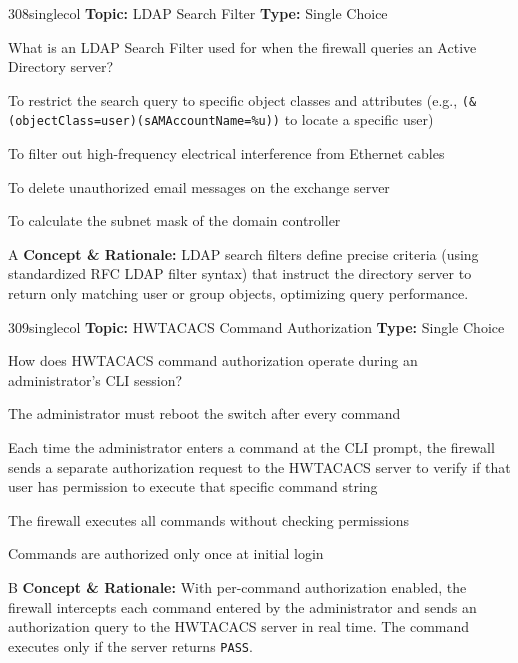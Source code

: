 \begin{qcard}{308}{singlecol}
\textcolor{darkslate!75}{\small\textbf{Topic:} LDAP Search Filter \hfill \textbf{Type:} Single Choice}\vspace{0.4em}\par
What is an LDAP Search Filter used for when the firewall queries an Active Directory server?
\begin{qoptions}
\item To restrict the search query to specific object classes and attributes (e.g., \texttt{(\&(objectClass=user)(sAMAccountName=\%u))} to locate a specific user)
\item To filter out high-frequency electrical interference from Ethernet cables
\item To delete unauthorized email messages on the exchange server
\item To calculate the subnet mask of the domain controller
\end{qoptions}
\end{qcard}
\nopagebreak
\begin{explainbox}{A}
\textbf{Concept \& Rationale:} LDAP search filters define precise criteria (using standardized RFC LDAP filter syntax) that instruct the directory server to return only matching user or group objects, optimizing query performance.
\end{explainbox}

\begin{qcard}{309}{singlecol}
\textcolor{darkslate!75}{\small\textbf{Topic:} HWTACACS Command Authorization \hfill \textbf{Type:} Single Choice}\vspace{0.4em}\par
How does HWTACACS command authorization operate during an administrator's CLI session?
\begin{qoptions}
\item The administrator must reboot the switch after every command
\item Each time the administrator enters a command at the CLI prompt, the firewall sends a separate authorization request to the HWTACACS server to verify if that user has permission to execute that specific command string
\item The firewall executes all commands without checking permissions
\item Commands are authorized only once at initial login
\end{qoptions}
\end{qcard}
\nopagebreak
\begin{explainbox}{B}
\textbf{Concept \& Rationale:} With per-command authorization enabled, the firewall intercepts each command entered by the administrator and sends an authorization query to the HWTACACS server in real time. The command executes only if the server returns \texttt{PASS}.
\end{explainbox}


